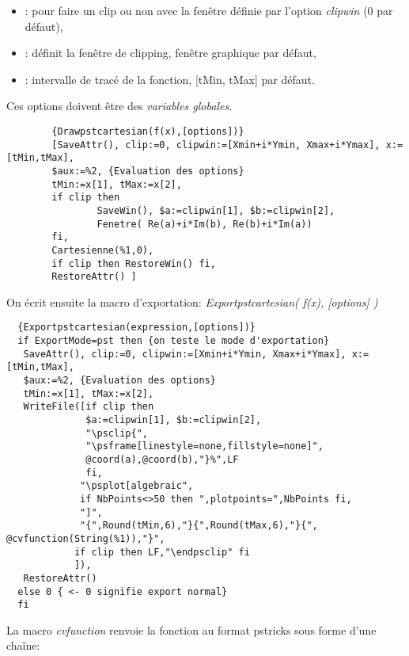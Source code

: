 \begin{itemize}
    \begin{itemize}
    \item {}: pour faire un clip ou non avec la fenêtre définie par l'option \textit{clipwin} (0 par défaut),
    \item {}: définit la fenêtre de clipping, fenêtre graphique par défaut,
    \item {}: intervalle de tracé de la fonction, [tMin, tMax] par défaut.
    \end{itemize}

Ces options doivent être des \textit{variables globales}.

\bigskip

\begin{verbatim}
        {Drawpstcartesian(f(x),[options])}
        [SaveAttr(), clip:=0, clipwin:=[Xmin+i*Ymin, Xmax+i*Ymax], x:=[tMin,tMax],
        $aux:=%2, {Evaluation des options}
        tMin:=x[1], tMax:=x[2],
        if clip then 
                SaveWin(), $a:=clipwin[1], $b:=clipwin[2],
                Fenetre( Re(a)+i*Im(b), Re(b)+i*Im(a))
        fi,
        Cartesienne(%1,0),
        if clip then RestoreWin() fi,
        RestoreAttr() ]
\end{verbatim}

On écrit ensuite la macro d'exportation: \textit{Exportpstcartesian( f(x), [options] )}

\bigskip

\begin{verbatim}
  {Exportpstcartesian(expression,[options])}
  if ExportMode=pst then {on teste le mode d'exportation}
   SaveAttr(), clip:=0, clipwin:=[Xmin+i*Ymin, Xmax+i*Ymax], x:=[tMin,tMax],
   $aux:=%2, {Evaluation des options}
   tMin:=x[1], tMax:=x[2],
   WriteFile([if clip then
              $a:=clipwin[1], $b:=clipwin[2],
              "\psclip{",
              "\psframe[linestyle=none,fillstyle=none]",
              @coord(a),@coord(b),"}%",LF
              fi,
             "\psplot[algebraic", 
             if NbPoints<>50 then ",plotpoints=",NbPoints fi,
             "]",
             "{",Round(tMin,6),"}{",Round(tMax,6),"}{", @cvfunction(String(%1)),"}",
            if clip then LF,"\endpsclip" fi
            ]),
   RestoreAttr()
  else 0 { <- 0 signifie export normal}
  fi
\end{verbatim}

\bigskip

La macro \textit{cvfunction} renvoie la fonction au format pstricks sous forme d'une chaîne:


\end{itemize}
